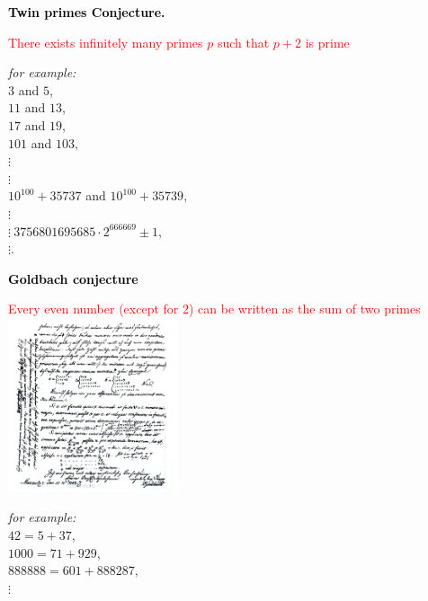 \documentclass[landscape,display]{powersem} %
\newcommand{\heading}[1]{%
 \begin{center}
  \large\bf
  \shadowbox{{\textcolor{conceptcolor}{#1}}}%
 \end{center}
 \vspace{1ex minus 1ex}}
\begin{document}
\begin{slide}
\heading{Some conjectures regarding prime numbers: 1/5 }\pause

\textcolor{black}{\textbf{Twin primes Conjecture.}}

\textcolor{red}{There exists infinitely many primes 
$p$ such that $p+2$ is prime}\pause
\vfill

\hspace*{4cm}
\begin{minipage}{7cm}
\textit{for example:} \\
$3$ and $5$,\\ $11$ and $13$,\\ $17$ and $19$,\\ $101$ and $103,$\\ $\vdots$\\
$\vdots$\\ $10^{100}+35737$ and $10^{100}+35739,$ \\ $\vdots$\\
$\vdots\ 3756801695685\cdot2^{666669} \pm 1,$\\ $\vdots$.
\end{minipage}
\end{slide}

\begin{slide}
\heading{Some conjectures regarding prime numbers: 2/5 }\pause

\textcolor{black}{\textbf{Goldbach conjecture}} 

\textcolor{red}{Every even number (except for $2$) can be written as the sum of two primes}\pause
 \includegraphics[width=5cm]{images/Letter_Goldbaxh-Euler.jpg}\pause
\vspace{-5cm}\hspace*{7cm}
\begin{minipage}{4cm}
\textit{for example:} \\
 $42=5+37$,\\ $1000=71+929$,\\ 
$888888=601+888287,$\\ $\vdots$\end{minipage}
\end{slide}
\end{document}
